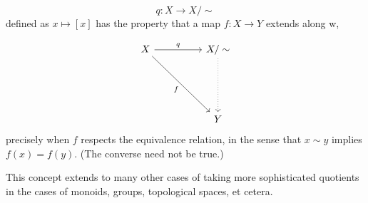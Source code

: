 \begin{equation*} 
	q:X \to X/\sim
\end{equation*}
defined as $x \mapsto [x]$ has the property that a map $f:X\to Y$ extends along w,

\begin{equation*} 
	\begin{tikzcd}
		X \arrow[rr, "q"] \arrow[rrddd, "f"'] && X/\sim \arrow[ddd, dotted]\\
		&&\\&&\\
		&& Y
	\end{tikzcd}
\end{equation*}
precisely when $f$ respects the equivalence relation, in the sense that $x \sim y$ implies $f(x) = f(y).$ (The converse need not be true.)

This concept extends to many other cases of taking more sophisticated quotients in the cases of monoids, groups, topological spaces, et cetera.